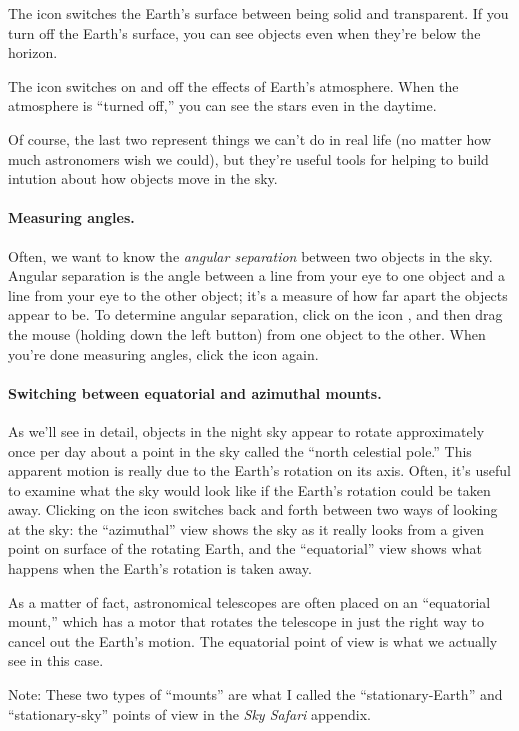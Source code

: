 The  icon switches the Earth's surface between being
solid and transparent. If you turn off the Earth's surface, you can
see objects even when they're below the horizon. 

The  icon switches on and off the effects of 
Earth's atmosphere. When the atmosphere is ``turned off,'' you
can see the stars even in the daytime.

Of course, the last two represent things we can't do in real life
(no matter how much astronomers wish we could), but they're
useful tools for helping to build intution about how
objects move in the sky.

\paragraph{Measuring angles.}
Often, we want to know the \textit{angular separation} between two
objects in the sky. Angular separation is the angle between a line from your eye
to one object and a line from your eye to the other object; it's a measure
of how far apart the objects appear to be. To determine
angular separation, click on the icon , and then drag
the mouse (holding down the left button) from one object to the other.
When you're done measuring angles, click the  icon again.

\paragraph{Switching between equatorial and azimuthal mounts.}
As we'll see in detail, objects in the night sky appear to rotate
approximately once per day about a point in the sky called the ``north
celestial pole.'' This apparent motion is really due to the 
Earth's rotation on its axis. 
Often, it's useful to examine what the sky would look like if
the Earth's rotation could be taken away. Clicking on the 
 icon switches back and forth between two ways of looking
at the sky: the ``azimuthal'' view shows  the sky as it really looks from 
a given point on surface of the rotating Earth, and the ``equatorial''
view shows
what happens when the Earth's rotation is taken away.

As a matter of fact, astronomical telescopes are often
placed on an ``equatorial mount,'' which has a motor that 
rotates the telescope
in just the right way to cancel out the Earth's  motion. The 
equatorial point of view is what we actually see in this case.  

Note: These two types of ``mounts'' are what I called the
``stationary-Earth'' and ``stationary-sky'' points of view
in the \textit{Sky Safari} appendix. 
